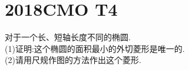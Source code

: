 \documentclass[]{article}
\title{}
\author{}
\date{}
\begin{document}
\maketitle
\section{2018CMO T4}{
对于一个长、短轴长度不同的椭圆.\\
(1)证明:这个椭圆的面积最小的外切菱形是唯一的.\\
(2)请用尺规作图的方法作出这个菱形.
}
\end{document}
